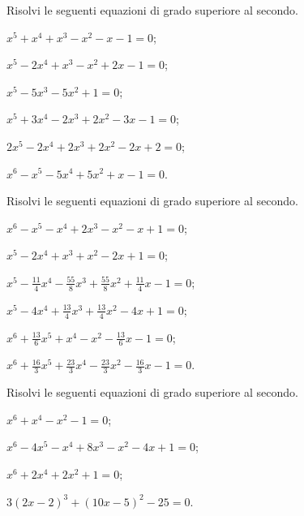 \begin{esercizio}[\Ast] %
Risolvi le seguenti equazioni di grado superiore al secondo.
\begin{multicols}{2}
\begin{enumeratea}
\item $x^5+x^4+x^3-x^2-x-1=0$;
\item $x^5-2x^4+x^3-x^2+2x-1=0$;
\item $x^5-5x^3-5x^2+1=0$;
\item $x^5+3x^4-2x^3+2x^2-3x-1=0$;
\item $2x^5-2x^4+2x^3+2x^2-2x+2=0$;
\item $x^6-x^5-5x^4+5x^2+x-1=0$.
\end{enumeratea}
\end{multicols}
\end{esercizio}
\newpage
\begin{esercizio}[\Ast] %
Risolvi le seguenti equazioni di grado superiore al secondo.
\begin{multicols}{2}
\begin{enumeratea}
\item $x^6-x^5-x^4+2x^3-x^2-x+1=0$;
\item $x^5-2x^4+x^3+x^2-2x+1=0$;
\item $x^5-\frac{11} 4x^4-\frac{55} 8x^3+\frac{55} 8x^2+\frac{11} 4x-1=0$;
\item $x^5-4x^4+\frac{13} 4x^3+\frac{13} 4x^2-4x+1=0$;
\item $x^6+\frac{13} 6x^5+x^4-x^2-\frac{13} 6x-1=0$;
\item $x^6+\frac{16} 3x^5+\frac{23} 3x^4-\frac{23} 3x^2-\frac{16} 3x-1=0$.
\end{enumeratea}
\end{multicols}
\end{esercizio}

\begin{esercizio}[\Ast] %
Risolvi le seguenti equazioni di grado superiore al secondo.
\begin{multicols}{2}
\begin{enumeratea}
\item $x^6+x^4-x^2-1=0$;
\item $x^6-4x^5-x^4+8x^3-x^2-4x+1=0$;
\item $x^6+2x^4+2x^2+1=0$;
\item $3(2x-2)^3+(10x-5)^2-25=0$.
\end{enumeratea}
\end{multicols}
\end{esercizio}

